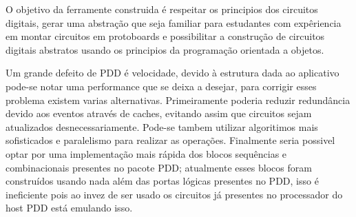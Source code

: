 \documentclass[11pt, twocolumn]{article}
\begin{document}
O objetivo da ferramente construida é respeitar os principios dos circuitos digitais, gerar uma abstração que seja familiar para estudantes com expêriencia em montar circuitos em protoboards e possibilitar a construção de circuitos digitais abstratos usando os principios da programação orientada a objetos.

Um grande defeito de PDD é velocidade, devido à estrutura dada ao aplicativo pode-se notar uma performance que se deixa a desejar,
para corrigir esses problema existem varias alternativas. Primeiramente poderia reduzir redundância devido aos eventos através de caches, evitando assim que circuitos sejam atualizados desnecessariamente.
Pode-se tambem utilizar algoritimos mais sofisticados e paralelismo para realizar as operações.
Finalmente seria possivel optar por uma implementação mais rápida dos blocos sequências e combinacionais presentes no pacote PDD; atualmente esses blocos foram construídos usando nada além das portas lógicas presentes no PDD, isso é ineficiente pois ao invez de ser usado os circuitos já presentes no processador do host PDD está emulando isso. 

\printbibliography
\end{document}
